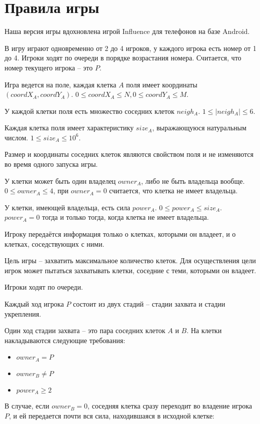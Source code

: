 \documentclass[12pt, a4paper]{article}
\begin{document}
{\section{Правила игры}}
Наша версия игры вдохновлена игрой Influence для телефонов на базе Android.

В игру играют одновременно от 2 до 4 игроков, у каждого игрока есть номер от 1 до 4. Игроки ходят по очереди в порядке возрастания номера. Считается, что номер текущего игрока -- это $P$.

Игра ведется на поле, каждая клетка $A$ поля имеет координаты $(coordX_A, coordY_A)$. $0 \le coordX_A \le N, 0 \le coordY_A \le M$.

У каждой клетки поля есть множество соседних клеток ${neigh_A}$. $1 \le |{neigh_A}| \le 6$.

Каждая клетка поля имеет характеристику $size_A$, выражающуюся натуральным числом. $1 \le size_A \le 10^6$.

Размер и координаты соседних клеток являются свойством поля и не изменяются во время одного запуска игры.

У клетки может быть один владелец $owner_A$, либо не быть владельца вообще. $0 \le owner_A \le 4$, при $owner_A = 0$ считается, что клетка не имеет владельца.

У клетки, имеющей владельца, есть сила $power_A$. $0 \le power_A \le size_A$. $power_A = 0$ тогда и только тогда, когда клетка не имеет владельца.

Игроку передаётся информация только о клетках, которыми он владеет, и о клетках, соседствующих с ними.

Цель игры -- захватить максимальное количество клеток.
Для осуществления цели игрок может пытаться захватывать клетки, соседние с теми, которыми он владеет.

Игроки ходят по очереди.

Каждый ход игрока $P$ состоит из двух стадий -- стадии захвата и стадии укрепления.

Один ход стадии захвата -- это пара соседних клеток $A$ и $B$. На клетки накладываются следующие требования:

\begin{itemize}
\item $owner_A = P$
\item $owner_B \neq P$
\item $power_A \ge 2$
\end{itemize}

В случае, если $owner_B = 0$, соседняя клетка сразу переходит во владение игрока $P$, и ей передается почти вся сила, находившаяся в исходной клетке:
\end{document}
